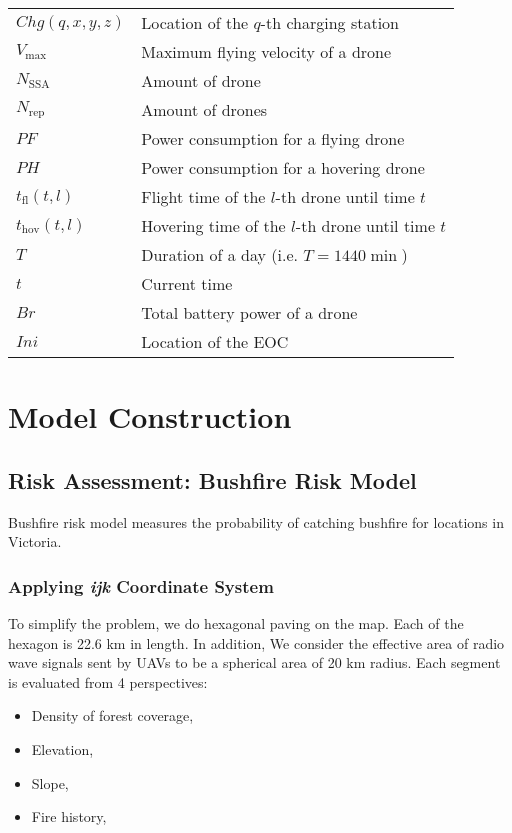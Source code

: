 \documentclass[13pt]{ctexart} %
\begin{document}
\begin{table}[h]
\begin{tabular}{>{\centering\arraybackslash}p{6em}>{\centering\arraybackslash}p{30em}}
        $Chg
        (q,x,y,z)$       & Location of the $q$-th charging station \\
        $V_{\text{max}}$ & Maximum flying velocity of a drone      \\
        $N_{\text{SSA}}$ & Amount of drone
        \uppercase\expandafter{\romannumeral1}                     \\
        $N_{\text{rep}}$ & Amount of drones
        \uppercase\expandafter{\romannumeral2}                     \\
        $PF$             & Power consumption for a flying drone    \\
        $PH$             & Power consumption for a hovering drone  \\
        $t_{\text{fl}}
        (t,l)$           & Flight time of the $l$-th drone
        until time $t$                                             \\
        $t_{\text{hov}}
        (t,l)$           & Hovering time of the $l$-th drone
        until time $t$                                             \\
        $T$              & Duration of a day (i.e. $T=1440 \min$)  \\
        $t$              & Current time                            \\
        $Br$             & Total battery power of a drone          \\
        $Ini$            & Location of the EOC                     \\
        \bottomrule %
    \end{tabular}
\end{table}

\section{Model Construction}
\subsection{Risk Assessment: Bushfire Risk Model}
Bushfire risk model measures the probability of catching bushfire for locations in Victoria.
\subsubsection{Applying \textit{ijk} Coordinate System}
To simplify the problem, we do hexagonal paving on the map.
Each of the hexagon is 22.6 km in length.
In addition, We consider the effective area of radio wave signals sent by UAVs to be a spherical area of 20 km radius. Each segment is evaluated from 4 perspectives:
\begin{itemize}
    \item Density of forest coverage,
    \item Elevation,
    \item Slope,
    \item Fire history,
\end{itemize}
\end{document}
